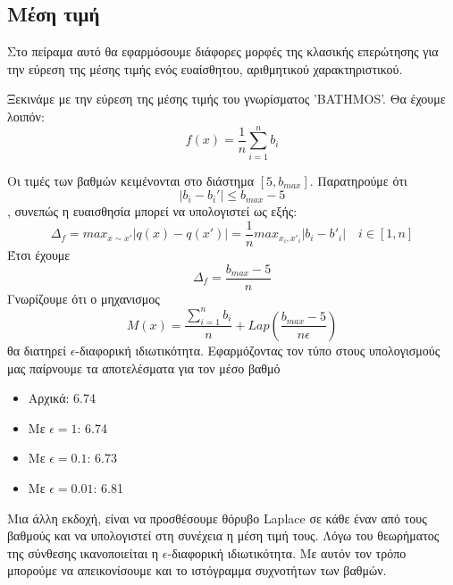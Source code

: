 \subsection{Μέση τιμή}

Στο πείραμα αυτό θα εφαρμόσουμε διάφορες μορφές της κλασικής επερώτησης για την εύρεση της μέσης τιμής ενός ευαίσθητου, αριθμητικού χαρακτηριστικού.

Ξεκινάμε με την εύρεση της μέσης τιμής του γνωρίσματος '\textlatin{BATHMOS}'. Θα έχουμε λοιπόν:
$$f(x)=\frac{1}{n}\sum_{i=1}^n b_i$$

Οι τιμές των βαθμών κειμένονται στο διάστημα $[5, b_{max}]$. Παρατηρούμε ότι $$|b_i - b_i'|\leq b_{max}-5$$, συνεπώς η ευαισθησία μπορεί να υπολογιστεί ως εξής:
$$\Delta_f=max_{x\sim x'}|q(x)-q(x')|=\frac{1}{n}max_{x_i,x'_i}|b_i - b'_i|\quad  i \in [1,n]$$
Έτσι έχουμε
$$\Delta_f=\frac{b_{max}-5}{n}$$
Γνωρίζουμε ότι ο μηχανισμος
$$M(x)=\frac{\sum_{i=1}^{n}b_i}{n}+Lap(\frac{b_{max}-5}{n\epsilon})$$
θα διατηρεί $\epsilon$-διαφορική ιδιωτικότητα\textlatin{\cite{dp2}}. Εφαρμόζοντας τον τύπο στους υπολογισμούς μας παίρνουμε τα αποτελέσματα για τον μέσο βαθμό

\begin{itemize}
    \item Αρχικά: 6.74
    \item Με $\epsilon=1$: 6.74
    \item Με $\epsilon=0.1$: 6.73
    \item Με $\epsilon=0.01$: 6.81
\end{itemize}


Μια άλλη εκδοχή, είναι να προσθέσουμε θόρυβο \textlatin{Laplace} σε κάθε έναν από τους βαθμούς και να υπολογιστεί στη συνέχεια η μέση τιμή τους. Λόγω του θεωρήματος της σύνθεσης ικανοποιείται η $\epsilon$-διαφορική ιδιωτικότητα. Με αυτόν τον τρόπο μπορούμε να απεικονίσουμε και το ιστόγραμμα συχνοτήτων των βαθμών.

